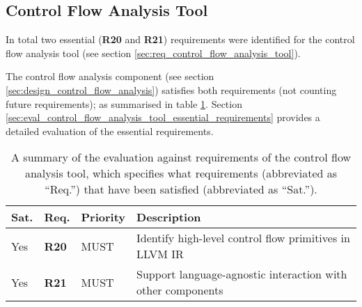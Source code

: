 
\subsection{Control Flow Analysis Tool}

In total two essential (\textbf{R20} and \textbf{R21}) requirements were identified for the control flow analysis tool (see section \ref{sec:req_control_flow_analysis_tool}).

The control flow analysis component (see section \ref{sec:design_control_flow_analysis}) satisfies both requirements (not counting future requirements); as summarised in table \ref{tbl:eval_summary_of_control_flow_analysis_tool}. Section \ref{sec:eval_control_flow_analysis_tool_essential_requirements} provides a detailed evaluation of the essential requirements.

\begin{table}[htbp]
	\begin{center}
		\begin{tabular}{|l|l|l|l|}
			\hline
			Sat. & Req. & Priority & Description \\
			\hline
			\rowcolor{light_green_3}
			Yes & \textbf{R20} & MUST & Identify high-level control flow primitives in LLVM IR \\
			\rowcolor{light_green_3}
			Yes & \textbf{R21} & MUST & Support language-agnostic interaction with other components \\
			\hline
		\end{tabular}
	\end{center}
	\caption{A summary of the evaluation against requirements of the control flow analysis tool, which specifies what requirements (abbreviated as ``Req.'') that have been satisfied (abbreviated as ``Sat.'').}
	\label{tbl:eval_summary_of_control_flow_analysis_tool}
\end{table}




